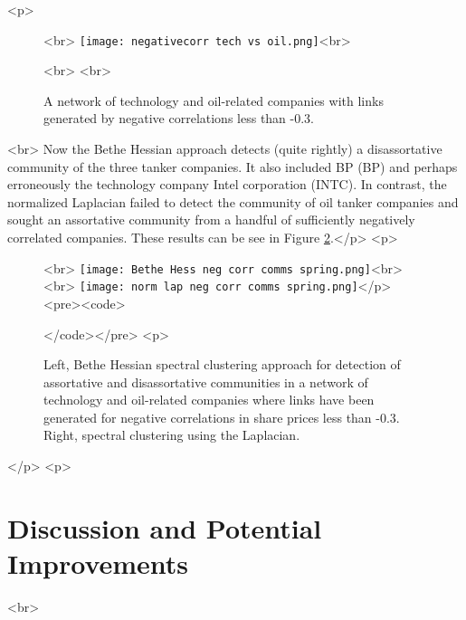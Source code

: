 <p>\begin{figure}[h]%
\centering<br>
\texttt{[image: negativecorr tech vs oil.png]}<br>
\caption{A network of technology and oil-related companies with links generated by negative correlations less than -0.3. }<br>
\label{techvsoilcomm1neg}<br>
\end{figure}<br>
Now the Bethe Hessian approach detects (quite rightly) a disassortative community of the three tanker companies. It also included BP (BP) and perhaps erroneously the technology company Intel corporation (INTC). In contrast, the normalized Laplacian failed to detect the community of oil tanker companies and sought an assortative community from a handful of sufficiently negatively correlated companies. These results can be see in Figure \ref{bethe v lap}.</p>
<p>\begin{figure}[h]%
\centering<br>
\texttt{[image: Bethe Hess neg corr comms spring.png]}<br>
\hfill<br>
\texttt{[image: norm lap neg corr comms spring.png]}</p>
<pre><code>\caption{Left, Bethe Hessian spectral clustering approach for detection of assortative and disassortative communities in a network of technology and oil-related companies where links have been generated for negative correlations in share prices less than -0.3. Right, spectral clustering using the Laplacian.}
\label{bethe v lap}
</code></pre>
<p>\end{figure}</p>
<p>\section{Discussion and Potential Improvements}<br>
